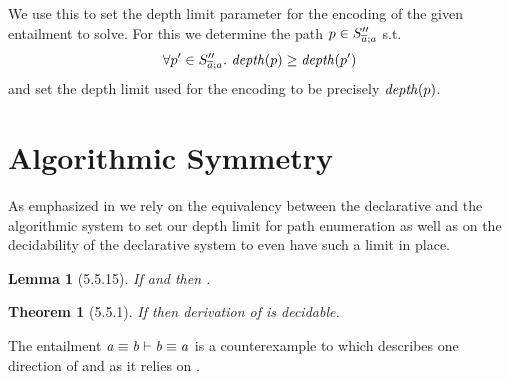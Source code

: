 \documentclass[a4paper]{article}
\newtheorem{theorem}{Theorem}
\newtheorem{lemma}{Lemma}
\begin{document}
We use this to set the depth limit parameter for the encoding
of the given entailment to solve.
For this we determine the path $p \in S''_{\overline{a};a}$ s.t.
\[ \forall p' \in S''_{\overline{a};a}.~\mathit{depth}(p) \geq \mathit{depth}(p') \]
and set the depth limit used for the encoding to be precisely $\mathit{depth}(p)$.

\section{Algorithmic Symmetry}
\label{sec:algo-symmetry}
As emphasized in 
we rely on the equivalency between the declarative and the algorithmic system
to set our depth limit for path enumeration
as well as on the decidability of the declarative system to even have such a limit in place.

\begin{lemma}[5.5.15]
  \label{lem:constraints-declarative-implies-algorithmic}
  If  and  then .
\end{lemma}

\begin{theorem}[5.5.1]
  \label{thm:declarative-system-decidable}
  If  then derivation of  is decidable.
\end{theorem}

The entailment $\mathit{a} \equiv \mathit{b} \vdash \mathit{b} \equiv \mathit{a}$ is a counterexample
to 
which describes one direction of 
and 
as it relies on .
\end{document}
